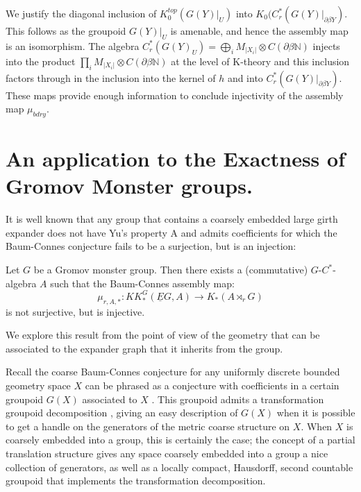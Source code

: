 \begin{example}
\begin{remark}
We justify the diagonal inclusion of $K_{0}^{top}(G(Y)|_{U})$ into $K_{0}(C^{*}_{r}(G(Y)|_{\partial\beta Y})$. This follows as the groupoid $G(Y)|_{U}$ is amenable, and hence the assembly map is an isomorphism.   The algebra $C^{*}_{r}(G(Y)_{U})= \bigoplus_{i}M_{\vert X_{i}\vert} \otimes C(\partial\beta \mathbb{N})$ injects into the product $\prod_{i} M_{\vert X_{i}\vert} \otimes C(\partial\beta \mathbb{N})$ at the level of K-theory and this inclusion factors through in the inclusion into the kernel of $h$ and into $C^{*}_{r}(G(Y)|_{\partial\beta Y})$. These maps provide enough information to conclude injectivity of the assembly map $\mu_{bdry}$.
\end{remark}

\section{An application to the Exactness of Gromov Monster groups.}

It is well known \cite{MR1911663,explg1} that any group that contains a coarsely embedded large girth expander does not have Yu's property A and admits coefficients for which the Baum-Connes conjecture fails to be a surjection, but is an injection:

\begin{theorem}\label{Thm:IT1}
Let $G$ be a Gromov monster group. Then there exists a (commutative) $G$-$C^{*}$-algebra $A$ such that the Baum-Connes assembly map:
\begin{equation*}
\mu_{r,A,*}: KK^{G}_{*}(\underline{E}G, A) \rightarrow K_{*}(A\rtimes_{r}G)
\end{equation*}
is not surjective, but is injective.
\end{theorem}

We explore this result from the point of view of the geometry that can be associated to the expander graph that it inherits from the group.

Recall the coarse Baum-Connes conjecture for any uniformly discrete bounded geometry space $X$ can be phrased as a conjecture with coefficients in a certain groupoid $G(X)$ associated to $X$ \cite{MR1905840}. This groupoid admits a transformation groupoid decomposition \cite[Lemma 3.3b)]{MR1905840}, giving an easy description of $G(X)$ when it is possible to get a handle on the generators of the metric coarse structure on $X$. When $X$ is coarsely embedded into a group, this is certainly the case; the concept of a partial translation structure \cite{MR2363428} gives any space coarsely embedded into a group a nice collection of generators, as well as a locally compact, Hausdorff, second countable \etale groupoid that implements the transformation decomposition.


\end{example}
